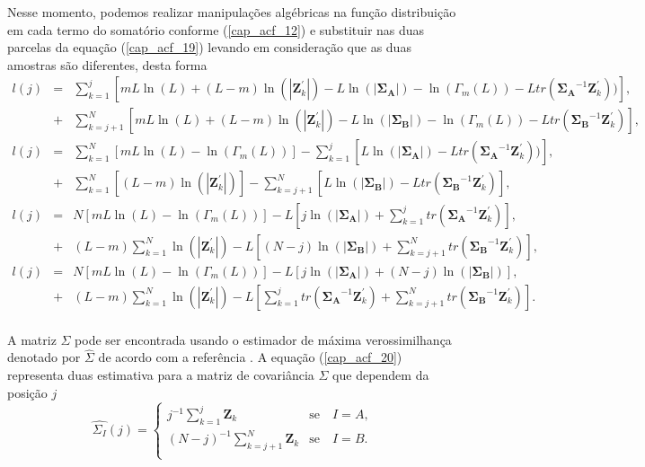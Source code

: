 Nesse momento, podemos realizar  manipulações algébricas na função distribuição em cada termo do somatório conforme (\ref{cap_acf_12}) e substituir nas duas parcelas da equação (\ref{cap_acf_19}) levando em consideração que as duas amostras são diferentes, desta forma
\begin{equation*}
\begin{array}{rcl}
	l(j)&=&\sum_{k=1}^{j}\left[mL\ln{\left(L\right)}+(L-m)\ln{\left(|\mathbf{Z}_{k}^{'}|\right)}- L\ln{\left(|\mathbf{\Sigma_{A}}|\right)}-\ln{\left(\Gamma_m(L)\right)}-L tr(\mathbf{\Sigma_{A}}^{-1}\mathbf{Z}_{k}^{'}))\right], \\
	&+&\sum_{k=j+1}^{N}\left[mL\ln{\left(L\right)}+(L-m)\ln{\left(|\mathbf{Z}_{k}^{'}|\right)}- L\ln{\left(|\mathbf{\Sigma_{B}}|\right)}-\ln{\left(\Gamma_m(L)\right)}-L tr(\mathbf{\Sigma_{B}}^{-1}\mathbf{Z}_{k}^{'})\right], \\
	l(j)&=&\sum_{k=1}^{N}\left[mL\ln{\left(L\right)}-\ln{\left(\Gamma_m(L)\right)}\right]-\sum_{k=1}^{j}\left[ L\ln{\left(|\mathbf{\Sigma_{A}}|\right)}-L tr(\mathbf{\Sigma_{A}}^{-1}\mathbf{Z}_{k}^{'}))\right], \\
	&+&\sum_{k=1}^{N}\left[(L-m)\ln{\left(|\mathbf{Z}_{k}^{'}|\right)}\right]- \sum_{k=j+1}^{N}\left[L\ln{\left(|\mathbf{\Sigma_{B}}|\right)}-L tr(\mathbf{\Sigma_{B}}^{-1}\mathbf{Z}_{k}^{'})\right], \\
	l(j)&=&N\left[mL\ln{\left(L\right)}-\ln{\left(\Gamma_m(L)\right)}\right]-L\left[j\ln{\left(|\mathbf{\Sigma_{A}}|\right)} +\sum_{k=1}^{j}tr(\mathbf{\Sigma_{A}}^{-1}\mathbf{Z}_{k}^{'})\right], \\
	&+&(L-m)\sum_{k=1}^{N}\ln{\left(|\mathbf{Z}_{k}^{'}|\right)}-L\left[(N-j)\ln{\left(|\mathbf{\Sigma_{B}}|\right)}+ \sum_{k=j+1}^{N}tr(\mathbf{\Sigma_{B}}^{-1}\mathbf{Z}_{k}^{'})\right], \\
	l(j)&=&N\left[mL\ln{\left(L\right)}-\ln{\left(\Gamma_m(L)\right)}\right]-L\left[j\ln{\left(|\mathbf{\Sigma_{A}}|\right)} +(N-j)\ln{\left(|\mathbf{\Sigma_{B}}|\right)}\right], \\
	&+&(L-m)\sum_{k=1}^{N}\ln{\left(|\mathbf{Z}_{k}^{'}|\right)}-L\left[\sum_{k=1}^{j}tr(\mathbf{\Sigma_{A}}^{-1}\mathbf{Z}_{k}^{'})+ \sum_{k=j+1}^{N}tr(\mathbf{\Sigma_{B}}^{-1}\mathbf{Z}_{k}^{'})\right]. \\
\end{array}
\end{equation*}

A matriz $\Sigma$ pode ser encontrada usando o estimador de máxima verossimilhança denotado por $\widehat{\Sigma}$ de acordo com a referência \citep{good}. A equação (\ref{cap_acf_20}) representa duas estimativa para a matriz de covariância $\Sigma$ que dependem da posição $j$
\begin{equation}\label{cap_acf_20}
\widehat{\Sigma_{I}}(j) = \left\{
\begin{array}{lc}
	j^{-1}\sum_{k=1}^{j}\mathbf{Z}_{k}  & \mbox{se}\quad I=A,  \\
        (N-j)^{-1}\sum_{k=j+1}^{N}\mathbf{Z}_{k} & \mbox{se}\quad I=B. \\
\end{array}
\right.
\end{equation}

